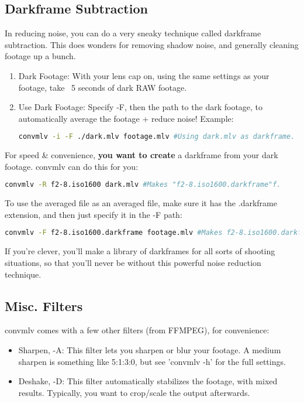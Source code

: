 \documentclass[a4paper,12pt]{article}
\begin{document}
	\subsection{Darkframe Subtraction}
		In reducing noise, you can do a very sneaky technique called darkframe subtraction. This does wonders for removing shadow noise, and generally
		cleaning footage up a bunch.
		
		\begin{enumerate}
			\item Dark Footage: With your lens cap on, using the same settings as your footage, take ~5 seconds of dark RAW footage.
			\item Use Dark Footage: Specify -F, then the path to the dark footage, to automatically average the footage + reduce noise! Example:
\begin{lstlisting}[language=bash]
	convmlv -i -F ./dark.mlv footage.mlv #Using dark.mlv as darkframe.
\end{lstlisting}
		\end{enumerate}
		
		For speed \& convenience, \textbf{you want to create} a darkframe from your dark footage. convmlv can do this for you:
		
\begin{lstlisting}[language=bash]
	convmlv -R f2-8.iso1600 dark.mlv #Makes "f2-8.iso1600.darkframe"f.
\end{lstlisting}
		
		To use the averaged file as an averaged file, make sure it has the .darkframe extension, and then just specify it in the -F path:
		
\begin{lstlisting}[language=bash]
	convmlv -F f2-8.iso1600.darkframe footage.mlv #Makes f2-8.iso1600.darkframe.
\end{lstlisting}
		
		If you're clever, you'll make a library of darkframes for all sorts of shooting situations, so that you'll never
		be without this powerful noise reduction technique.
	
	\subsection{Misc. Filters}
		convmlv comes with a few other filters (from FFMPEG), for convenience:
		
		\begin{itemize}
			\item Sharpen, -A: This filter lets you sharpen or blur your footage. A medium sharpen is something like 5:1:3:0, but 
			see 'convmlv -h' for the full settings.
			\item Deshake, -D: This filter automatically stabilizes the footage, with mixed results. Typically, you want to crop/scale the output
			afterwards.
		\end{itemize}
		
\end{document}
